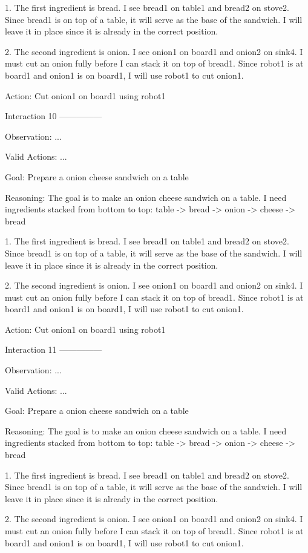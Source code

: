 1. The first ingredient is bread. I see bread1 on table1 and bread2 on stove2. Since bread1 is on top of a table, it will serve as the base of the sandwich. I will leave it in place since it is already in the correct position.

2. The second ingredient is onion. I see onion1 on board1 and onion2 on sink4. I must cut an onion fully before I can stack it on top of bread1. Since robot1 is at board1 and onion1 is on board1, I will use robot1 to cut onion1.

Action: Cut onion1 on board1 using robot1


Interaction 10
---------------


Observation:
...

Valid Actions:
...

Goal: Prepare a onion cheese sandwich on a table


Reasoning: The goal is to make an onion cheese sandwich on a table. I need ingredients stacked from bottom to top: table -> bread -> onion -> cheese -> bread

1. The first ingredient is bread. I see bread1 on table1 and bread2 on stove2. Since bread1 is on top of a table, it will serve as the base of the sandwich. I will leave it in place since it is already in the correct position.

2. The second ingredient is onion. I see onion1 on board1 and onion2 on sink4. I must cut an onion fully before I can stack it on top of bread1. Since robot1 is at board1 and onion1 is on board1, I will use robot1 to cut onion1.

Action: Cut onion1 on board1 using robot1


Interaction 11
---------------


Observation:
...

Valid Actions:
...

Goal: Prepare a onion cheese sandwich on a table


Reasoning: The goal is to make an onion cheese sandwich on a table. I need ingredients stacked from bottom to top: table -> bread -> onion -> cheese -> bread

1. The first ingredient is bread. I see bread1 on table1 and bread2 on stove2. Since bread1 is on top of a table, it will serve as the base of the sandwich. I will leave it in place since it is already in the correct position.

2. The second ingredient is onion. I see onion1 on board1 and onion2 on sink4. I must cut an onion fully before I can stack it on top of bread1. Since robot1 is at board1 and onion1 is on board1, I will use robot1 to cut onion1.

